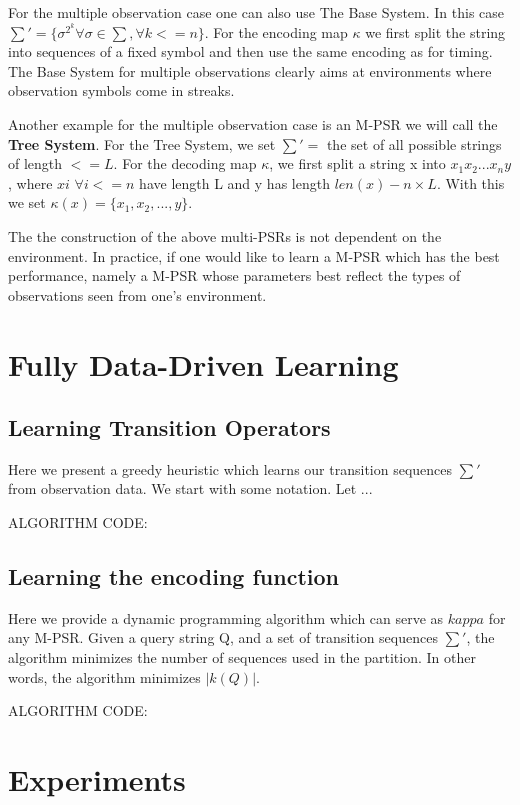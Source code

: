 \documentclass[letterpaper]{article}
\begin{document}
For the multiple observation case one can also use The Base System. In this case $\sum' = \{\sigma^{2^k}\forall \sigma \in \sum, \forall k <= n\}$. For the encoding map $\kappa$ we first split the string into sequences of a fixed symbol and then use the same encoding as for timing. The Base System for multiple observations clearly aims at environments where observation symbols come in streaks.
 
Another example for the multiple observation case is an M-PSR we will call the \textbf{Tree System}. For the Tree System, we set $\sum'=$ the set of all possible strings of length $<= L$. For the decoding map $\kappa$, we first split a string x into $x_1x_2...x_ny$, where $xi$ $\forall i<=n$ have length L and y has length $len(x) - n \times L$. With this we set $\kappa(x) = \{x_1,x_2,...,y\}$.

The the construction of the above multi-PSRs is not dependent on the environment. In practice, if one would like to learn a M-PSR which has the best performance, namely a M-PSR whose parameters best reflect the types of observations seen from one's environment. 

\section{Fully Data-Driven Learning}

\subsection{Learning Transition Operators}

Here we present a greedy heuristic which learns our transition sequences $\sum'$ from observation data. We start with some notation. Let ... 

ALGORITHM CODE:

\subsection{Learning the encoding function}

Here we provide a dynamic programming algorithm which can serve as $kappa$ for any M-PSR. Given a query string Q, and a set of transition sequences $\sum'$, the algorithm minimizes the number of sequences used in the partition. In other words, the algorithm minimizes $|k(Q)|$.

ALGORITHM CODE:


\section{Experiments}
\end{document}
